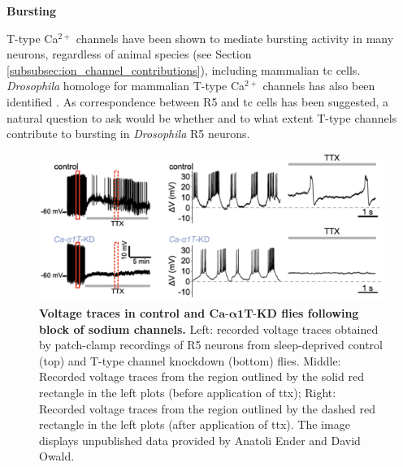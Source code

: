 \documentclass[../main.tex]{subfiles}
\begin{document}
\noindent\textbf{Bursting}

T-type Ca$^{2+}$ channels have been shown to mediate bursting activity in many neurons, regardless of animal species (see Section \ref{subsubsec:ion_channel_contributions}), including mammalian \gls{tc} cells.  \textit{Drosophila} homologe for mammalian T-type Ca$^{2+}$ channels has also been identified \parencite{jeongCaa1TFlyTtype2015}.
As correspondence between R5 and \gls{tc} cells has been suggested, a natural question to ask would be whether and to what extent T-type channels contribute to bursting in \textit{Drosophila} R5 neurons.

\begin{figure}[!t]
    \centering
    \includegraphics[width=0.98\linewidth]{../img/sleep_and_r5_network/CaaT_knock_and_ttx/voltage_traces_labelled.png}
    \caption[Voltage traces in control and $Ca\text{-}\alpha1T\text{-KD}$ flies following block of sodium channels]{
        \textbf{Voltage traces in control and $\bm{Ca\text{-}\alpha1T\text{-KD}}$ flies following block of sodium channels.}
        Left: recorded voltage traces obtained by patch-clamp recordings of R5 neurons from sleep-deprived control (top) and T-type channel knockdown (bottom) flies.
        Middle: Recorded voltage traces from the region outlined by the solid red rectangle in the left plots (before application of \gls{ttx});
        Right: Recorded voltage traces from the region outlined by the dashed red rectangle in the left plots (after application of \gls{ttx}). The image displays unpublished data provided by Anatoli Ender and David Owald.
    }
    \label{fig:sleep_r5_knock_ttx_voltage}
\end{figure}
\end{document}
